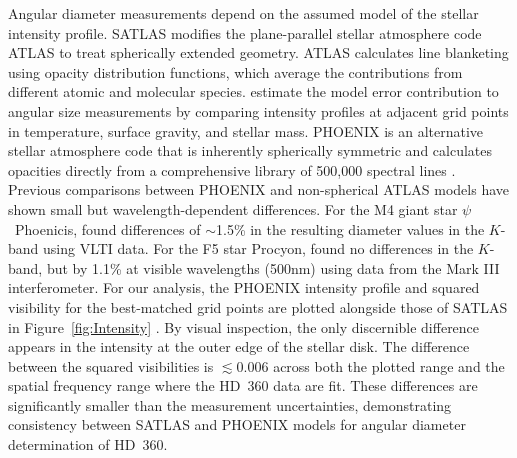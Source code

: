 \documentclass[linenumbers,trackchanges,margins]{aastex701}
\begin{document}
Angular diameter measurements depend on the assumed model of the stellar intensity profile. SATLAS modifies the plane-parallel stellar atmosphere code ATLAS to treat spherically extended geometry. ATLAS calculates line blanketing using opacity distribution functions, which average the contributions from different atomic and molecular species. \citet{2018A&A...616A..68G} estimate the model error contribution to angular size measurements by comparing intensity profiles at adjacent grid points in temperature, surface gravity, and stellar mass.
PHOENIX is an alternative stellar atmosphere code that is inherently spherically symmetric and calculates opacities directly from a comprehensive library of 500,000 spectral lines \citep{2013A&A...553A...6H}. Previous comparisons between PHOENIX and non-spherical ATLAS models have shown small but wavelength-dependent differences. For the M4 giant star $\psi$~Phoenicis, \citet{2004A&A...413..711W} found differences of $\sim$1.5\% in the resulting diameter values in the $K$-band using VLTI data. For the F5 star Procyon, \citet{2005ApJ...633..424A} found no differences in the $K$-band, but by 1.1\% at visible wavelengths (500nm) using data from the Mark III interferometer.
For our analysis, the PHOENIX intensity profile and squared visibility for the best-matched grid points are plotted alongside those of SATLAS in Figure~\ref{fig:Intensity} \citep{2023A&A...674A..63C}. By visual inspection, the only discernible difference appears in the intensity at the outer edge of the stellar disk. The difference between the squared visibilities is $\lesssim 0.006$ across both the plotted range and the spatial frequency range where the HD~360 data are fit. These differences are significantly smaller than the measurement uncertainties, demonstrating consistency between SATLAS and PHOENIX models for angular diameter determination of HD~360.


\end{document}
